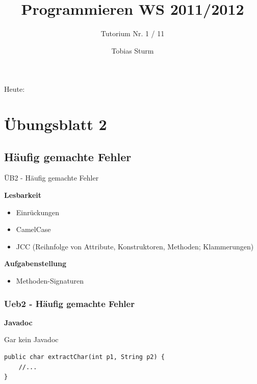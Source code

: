 \documentclass[18pt]{beamer}
\title[Proggen WS11/12]{Programmieren WS 2011/2012}
\subtitle{Tutorium Nr. 1 / 11}
\author{Tobias Sturm} %
\institute{Zertifizierbare Vertrauenswürdige Informatiksysteme}
\date[23.1.12] %
\begin{document}


\begin{frame}
	\titlepage
\end{frame}


\begin{frame}{Heute:}
	\tableofcontents
\end{frame}


\section{Übungsblatt 2}
\subsection{Häufig gemachte Fehler}
\begin{frame}{ÜB2 - Häufig gemachte Fehler}

		\textbf{Lesbarkeit}
		
		\begin{itemize}
			\item Einrückungen
			\item CamelCase
			\item JCC (Reihnfolge von Attribute, Konstruktoren, Methoden; Klammerungen)
		\end{itemize}
		
		\textbf{Aufgabenstellung}
		
		\begin{itemize}
			\item Methoden-Signaturen
		\end{itemize}
\end{frame}


\begin{frame}[containsverbatim]
	\frametitle{Ueb2 - Häufig gemachte Fehler}
		\textbf{Javadoc}
		
		Gar kein Javadoc
		
		\begin{lstlisting}
public char extractChar(int p1, String p2) {
	//...
}		\end{lstlisting}
\end{frame}
\end{document}
